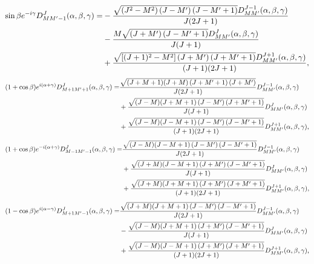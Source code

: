 \begin{align}
 \sin \beta e^{-i \gamma} D_{M M^{\prime}-1}^{J}(\alpha, \beta, \gamma)=&-\frac{\sqrt{\left(J^{2}-M^{2}\right)\left(J-M^{\prime}\right)\left(J-M^{\prime}+1\right)} D_{M M^{\prime}}^{J-1}(\alpha, \beta, \gamma)}{J(2 J+1)}  \notag\\
&- \frac{M \sqrt{\left(J+M^{\prime}\right)\left(J-M^{\prime}+1\right)} D_{M M^{\prime}}^{J}(\alpha, \beta, \gamma)}{J(J+1)}  \notag\\
&+ \frac{\sqrt{\left[(J+1)^{2}-M^{2}\right]\left(J+M^{\prime}\right)\left(J+M^{\prime}+1\right)} D_{M M^{\prime}}^{J+1}(\alpha, \beta, \gamma)}{(J+1)(2 J+1)} , \label{eq:4:8:5}
\end{align}
\begin{align}
(1+\cos \beta) e^{i(\alpha+\gamma)} D_{M+1 M^{\prime}+1}^{J}(\alpha, \beta, \gamma)=& \frac{\sqrt{(J+M+1)(J+M)\left(J+M^{\prime}+1\right)\left(J+M^{\prime}\right)}}{J(2 J+1)} D_{M M^{\prime}}^{J-1}(\alpha, \beta, \gamma)  \notag\\
&+\frac{\sqrt{(J-M)(J+M+1)\left(J-M^{\prime}\right)\left(J+M^{\prime}+1\right)}}{J(J+1)} D_{M M^{\prime}}^{J}(\alpha, \beta, \gamma)  \notag\\
&+\frac{\sqrt{(J-M)(J-M+1)\left(J-M^{\prime}\right)\left(J-M^{\prime}+1\right)}}{(J+1)(2 J+1)} D_{M M^{\prime}}^{J+1}(\alpha, \beta, \gamma), \label{eq:4:8:6}
\end{align}
\begin{align}
(1+\cos \beta) e^{-i(\alpha+\gamma)} D_{M-1 M^{\prime}-1}^{J}(\alpha, \beta, \gamma)=& \frac{\sqrt{(J-M)(J-M+1)\left(J-M^{\prime}\right)\left(J-M^{\prime}+1\right)}}{J(2 J+1)} D_{M M^{\prime}}^{J-1}(\alpha, \beta, \gamma)  \notag\\
&+\frac{\sqrt{(J+M)(J-M+1)\left(J+M^{\prime}\right)\left(J-M^{\prime}+1\right)}}{J(J+1)} D_{M M^{\prime}}^{J}(\alpha, \beta, \gamma)  \notag\\
&+\frac{\sqrt{(J+M)(J+M+1)\left(J+M^{\prime}\right)\left(J+M^{\prime}+1\right)}}{(J+1)(2 J+1)} D_{M M^{\prime}}^{J+1}(\alpha, \beta, \gamma),  \label{eq:4:8:7}
\end{align}\begin{align}
(1-\cos \beta) e^{i(\alpha-\gamma)} D_{M+1 M^{\prime}-1}^{J}(\alpha, \beta, \gamma) =& \frac{\sqrt{(J+M)(J+M+1)\left(J-M^{\prime}\right)\left(J-M^{\prime}+1\right)}}{J(2 J+1)} D_{M M^{\prime}}^{J-1}(\alpha, \beta, \gamma)  \notag\\
&-\frac{\sqrt{(J-M)(J+M+1)\left(J+M^{\prime}\right)\left(J-M^{\prime}+1\right)}}{J(J+1)} D_{M M^{\prime}}^{J}(\alpha, \beta, \gamma)  \notag\\
&+\frac{\sqrt{(J-M)(J-M+1)\left(J+M^{\prime}\right)\left(J+M^{\prime}+1\right)}}{(J+1)(2 J+1)} D_{M M^{\prime}}^{J+1}(\alpha, \beta, \gamma),  \label{eq:4:8:8}
\end{align}

